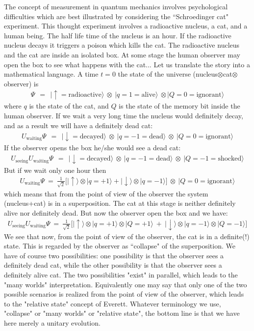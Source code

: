 \documentclass[onecolumn,fleqn, 11pt]{revtex4}
\newcommand{\tbox}[1]{\text{#1}}
\newcommand{\beq}{\begin{eqnarray}}
\newcommand{\eeq}{\end{eqnarray}}
\begin{document}
The concept of measurement in quantum mechanics involves 
psychological difficulties which are best 
illustrated by considering the ``Schroedinger cat" experiment.  
This thought experiment involves a radioactive nucleus, 
a cat, and a human being.  
The half life time of the nucleus is an hour. 
If the radioactive nucleus decays it triggers 
a poison which kills the cat. 
The radioactive nucleus and the cat are inside 
an isolated box. At some stage the human observer 
may open the box to see what happens with the cat...   
Let us translate the story into a mathematical language.  
A time $t=0$ the state of the universe (nucleus$\otimes$cat$\otimes$observer) is 
\beq
\Psi \ \ = \ \ 
|\uparrow=\mbox{radioactive}\rangle \ \otimes 
\ |{q=1=\mbox{alive}}\rangle 
\ \otimes |{Q=0=\mbox{ignorant}}\rangle
\eeq
where $q$ is the state of the cat, and $Q$ is the state 
of the memory bit inside the human observer.    
If we wait a very long time the nucleus would 
definitely decay, and as a result we will have a 
definitely dead cat:
\beq
U_{\tbox{waiting}} \Psi 
\ \ = \ \
|\downarrow=\mbox{decayed}\rangle \ \otimes 
\ |{q=-1=\mbox{dead}}\rangle 
\ \otimes \ |{Q=0=\mbox{ignorant}}\rangle
\eeq
If the observer opens the box he/she would see a dead cat:
\beq
U_{\tbox{seeing}} U_{\tbox{waiting}} \Psi 
\ \ = \ \ 
|\downarrow=\mbox{decayed}\rangle \ \otimes 
\ |{q=-1=\mbox{dead}}\rangle 
\ \otimes \ |{Q=-1=\mbox{shocked}}\rangle
\eeq
But if we wait only one hour then 
\beq
U_{\tbox{waiting}} \Psi \ = 
\ \frac{1}{\sqrt{2}} \Big[ 
|\uparrow\rangle  \otimes |q=+1\rangle  + |\downarrow\rangle  \otimes |q=-1\rangle  
\Big]  
\ \otimes \ |{Q=0=\mbox{ignorant}}\rangle
\eeq
which means that from the point of view 
of the observer the system (nucleus+cat) 
is in a superposition. The cat at this 
stage is neither definitely alive 
nor definitely dead. But now the 
observer open the box and we have:
\beq
U_{\tbox{seeing}} U_{\tbox{waiting}} \Psi \ = 
\ \frac{1}{\sqrt{2}} \Big[ 
|\uparrow\rangle  \otimes |q=+1\rangle \otimes |Q=+1 \rangle
\ + \ 
|\downarrow\rangle  \otimes |q=-1\rangle \otimes |Q=-1\rangle
\Big]  
\eeq
We see that now, from the point of view of the observer,  
the cat is in a definite(!) state. This is regarded by 
the observer as ``collapse" of the superposition.
We have of course two possibilities: one possibility is that  
the observer sees a definitely dead cat, while the other 
possibility is that the observer sees a definitely alive cat. 
The two possibilities "exist" in parallel, which leads to 
the "many worlds" interpretation.  Equivalently one may 
say that only one of the two possible scenarios is realized 
from the point of view of the observer,   
which leads to the "relative state" concept of Everett.
Whatever terminology we use, "collapse" or "many worlds" 
or "relative state", the bottom line is that we have 
here merely a unitary evolution. 
 
\end{document}
